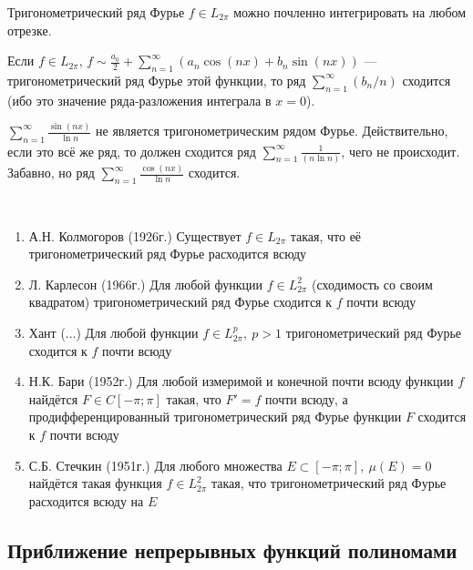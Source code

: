 \begin{corollary}
	Тригонометрический ряд Фурье $f \in L_{2\pi}$ можно почленно интегрировать на любом отрезке.
\end{corollary}

\begin{corollary}
	Если $f \in L_{2\pi}$, $f \sim \frac{a_0}{2} + \sum_{n = 1}^\infty (a_n\cos(nx) + b_n\sin(nx))$ --- тригонометрический ряд Фурье этой функции, то ряд $\sum_{n = 1}^\infty (b_n / n)$ сходится (ибо это значение ряда-разложения интеграла в $x = 0$).
\end{corollary}

\begin{example}
	$\sum_{n = 1}^\infty \frac{\sin(nx)}{\ln n}$ не является тригонометрическим рядом Фурье. Действительно, если это всё же ряд, то должен сходится ряд $\sum_{n = 1}^\infty \frac{1}{(n\ln n)}$, чего не происходит. Забавно, но ряд $\sum_{n = 1}^\infty \frac{\cos(nx)}{\ln n}$ сходится.
\end{example}

\begin{note}~
	\begin{enumerate}
		\item А.Н. Колмогоров (1926г.) Существует $f \in L_{2\pi}$ такая, что её тригонометрический ряд Фурье расходится всюду
		
		\item Л. Карлесон (1966г.) Для любой функции $f \in L_{2\pi}^2$ (сходимость со своим квадратом) тригонометрический ряд Фурье сходится к $f$ почти всюду
		
		\item Хант (...) Для любой функции $f \in L_{2\pi}^p,\ p > 1$ тригонометрический ряд Фурье сходится к $f$ почти всюду
		
		\item Н.К. Бари (1952г.) Для любой измеримой и конечной почти всюду функции $f$ найдётся $F \in C[-\pi; \pi]$ такая, что $F' = f$ почти всюду, а продифференцированный тригонометрический ряд Фурье функции $F$ сходится к $f$ почти всюду
		
		\item С.Б. Стечкин (1951г.) Для любого множества $E \subset [-\pi; \pi],\ \mu(E) = 0$ найдётся такая функция $f \in L_{2\pi}^2$ такая, что тригонометрический ряд Фурье расходится всюду на $E$
	\end{enumerate}
\end{note}

\subsection{Приближение непрерывных функций полиномами}


